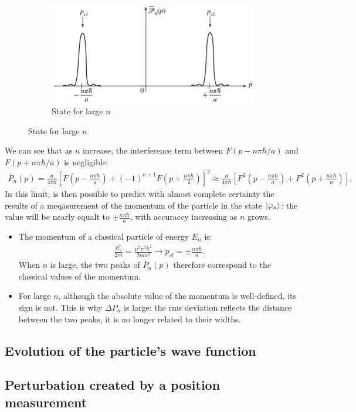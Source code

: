 \begin{figure}[h!]
    \hfill
    \begin{subfigure}{.3\columnwidth}
        \centering
        \includegraphics[width=\columnwidth]{PartOne/ChapterTwo/infinitewell_largen.png}
        \caption{State for large $n$}
    \end{subfigure}
\end{figure} 
We can see that as $n$ increase, the interference term between $F(p-n\pi\hbar/a)$ and $F(p+n\pi\hbar/a)$ is negligible:
\begin{align*}
    \bar{P}_n(p)=\frac{a}{4\pi\hbar}\left[F\left(p-\frac{n\pi\hbar}{a}\right)+(-1)^{n+1}F\left(p+\frac{n\pi\hbar}{2}\right)\right]^2\approx\frac{a}{4\pi\hbar}\left[F^2\left(p-\frac{n\pi\hbar}{a}\right)+F^2\left(p+\frac{n\pi\hbar}{a}\right)\right].
\end{align*}
In this limit, is then possible to predict with almost complete certainty the results of a meqasurement of the momentum of the particle in the state $|\varphi_n\rangle$: the value will be nearly equalt to 
$\pm\frac{n\pi\hbar}{a}$, with accuraccy increasing as $n$ grows.
\begin{itemize}[itemsep=0pt,topsep=0pt]
    \item The momentum of a classical particle of energy $E_n$ is:
    \begin{align*}
        \frac{p^2_{cl}}{2m}=\frac{n^2\pi^2\hbar^2}{2ma^2}\longrightarrow p_{cl}=\pm\frac{n\pi\hbar}{a}.
    \end{align*}
    When $n$ is large, the two peaks of $\bar{P}_n(p)$ therefore correspond to the classical values of the momentum.
    \item For large $n$, although the absolute value of the momentum is well-defined, its sign is not. This is why $\Delta P_n$ is large: the rms deviation reflects the distance 
    between the two peaks, it is no longer related to their widths.
\end{itemize}
\subsection{Evolution of the particle's wave function}



\subsection{Perturbation created by a position measurement}